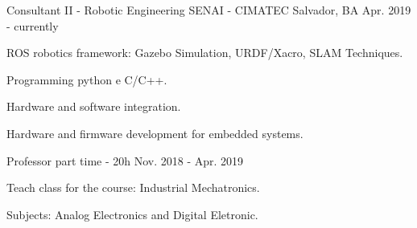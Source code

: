 

\begin{cventries}

  \cventry
    {Consultant II - Robotic Engineering} %
    {SENAI - CIMATEC} %
    {Salvador, BA} %
    {Apr. 2019 - currently} %
    {
      \begin{cvitems} %
        \item {ROS robotics framework: Gazebo Simulation, URDF/Xacro, SLAM Techniques.}
        \item {Programming python e C/C++.}
        \item {Hardware and software integration.}
        \item { Hardware and firmware development for embedded systems.}
      \end{cvitems}
    }

  \cventry
    {Professor part time - 20h} %
    {} %
    {} %
    {Nov. 2018 - Apr. 2019} %
    {
      \begin{cvitems} %
        \item {Teach class for the course: Industrial Mechatronics.}
        \item {Subjects: Analog Electronics and Digital Eletronic.}
      \end{cvitems}
    }

    

\end{cventries}
